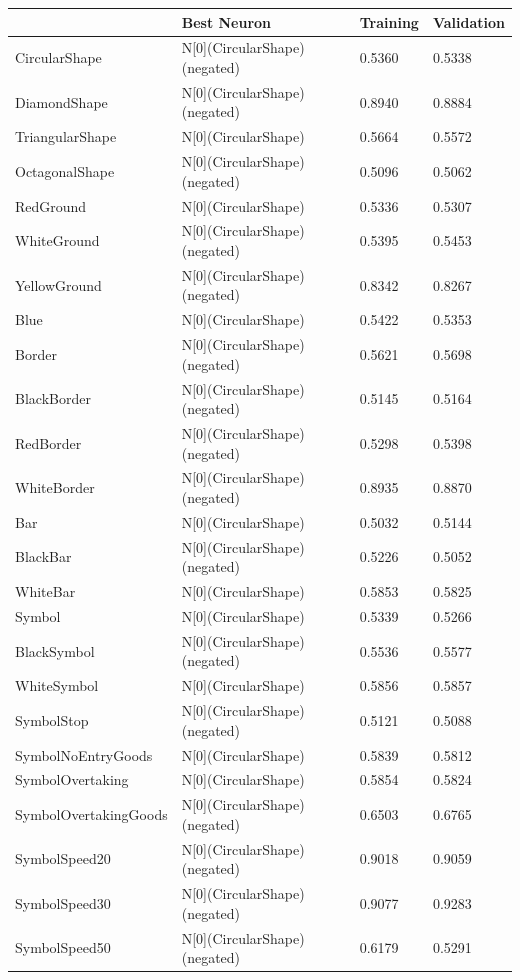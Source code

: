 \begin{tabular}{llll}
\toprule
 & Best Neuron & Training & Validation \\
\midrule
CircularShape & N[0](CircularShape) (negated) & 0.5360 & 0.5338 \\
DiamondShape & N[0](CircularShape) (negated) & 0.8940 & 0.8884 \\
TriangularShape & N[0](CircularShape) & 0.5664 & 0.5572 \\
OctagonalShape & N[0](CircularShape) (negated) & 0.5096 & 0.5062 \\
RedGround & N[0](CircularShape) & 0.5336 & 0.5307 \\
WhiteGround & N[0](CircularShape) (negated) & 0.5395 & 0.5453 \\
YellowGround & N[0](CircularShape) (negated) & 0.8342 & 0.8267 \\
Blue & N[0](CircularShape) & 0.5422 & 0.5353 \\
Border & N[0](CircularShape) (negated) & 0.5621 & 0.5698 \\
BlackBorder & N[0](CircularShape) (negated) & 0.5145 & 0.5164 \\
RedBorder & N[0](CircularShape) (negated) & 0.5298 & 0.5398 \\
WhiteBorder & N[0](CircularShape) (negated) & 0.8935 & 0.8870 \\
Bar & N[0](CircularShape) & 0.5032 & 0.5144 \\
BlackBar & N[0](CircularShape) (negated) & 0.5226 & 0.5052 \\
WhiteBar & N[0](CircularShape) & 0.5853 & 0.5825 \\
Symbol & N[0](CircularShape) & 0.5339 & 0.5266 \\
BlackSymbol & N[0](CircularShape) (negated) & 0.5536 & 0.5577 \\
WhiteSymbol & N[0](CircularShape) & 0.5856 & 0.5857 \\
SymbolStop & N[0](CircularShape) (negated) & 0.5121 & 0.5088 \\
SymbolNoEntryGoods & N[0](CircularShape) & 0.5839 & 0.5812 \\
SymbolOvertaking & N[0](CircularShape) & 0.5854 & 0.5824 \\
SymbolOvertakingGoods & N[0](CircularShape) (negated) & 0.6503 & 0.6765 \\
SymbolSpeed20 & N[0](CircularShape) (negated) & 0.9018 & 0.9059 \\
SymbolSpeed30 & N[0](CircularShape) (negated) & 0.9077 & 0.9283 \\
SymbolSpeed50 & N[0](CircularShape) (negated) & 0.6179 & 0.5291 \\

\end{tabular}
